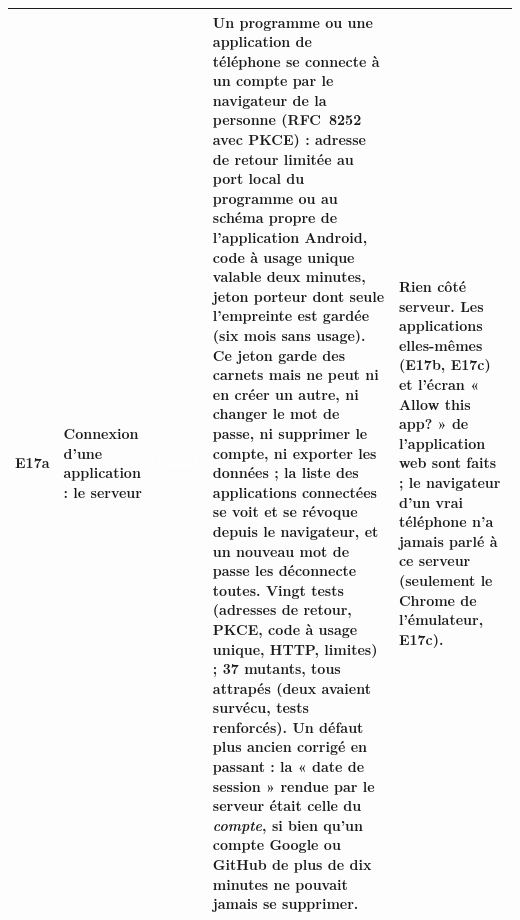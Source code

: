 \documentclass[10pt,a4paper]{article}
\newcommand{\etat}[1]{\colorbox{c#1}{\textcolor{white}{\scriptsize\textbf{\csname lbl#1\endcsname}}}}
\newcommand{\point}[5]{\stepcounter{n#3}#1 & \textbf{#2} & \etat{#3} & #4 & #5 \\ \midrule}
\begin{document}
{\begin{longtable}{@{}p{0.75cm} p{2.5cm} p{2.25cm} p{5.15cm} p{4.95cm}@{}}
\point{E17a}{Connexion d'une application : le serveur}{fait}{Un programme ou une application de téléphone se connecte à un compte par le navigateur de la personne (RFC~8252 avec PKCE) : adresse de retour limitée au port local du programme ou au schéma propre de l'application Android, code à usage unique valable deux minutes, jeton porteur dont seule l'empreinte est gardée (six mois sans usage). Ce jeton garde des carnets mais ne peut ni en créer un autre, ni changer le mot de passe, ni supprimer le compte, ni exporter les données ; la liste des applications connectées se voit et se révoque depuis le navigateur, et un nouveau mot de passe les déconnecte toutes. Vingt tests (adresses de retour, PKCE, code à usage unique, HTTP, limites) ; 37 mutants, tous attrapés (deux avaient survécu, tests renforcés). Un défaut plus ancien corrigé en passant : la « date de session » rendue par le serveur était celle du \emph{compte}, si bien qu'un compte Google ou GitHub de plus de dix minutes ne pouvait jamais se supprimer.}{Rien côté serveur. Les applications elles-mêmes (E17b, E17c) et l'écran « Allow this app? » de l'application web sont faits ; le navigateur d'un vrai téléphone n'a jamais parlé à ce serveur (seulement le Chrome de l'émulateur, E17c).}

\end{longtable}}
\end{document}
